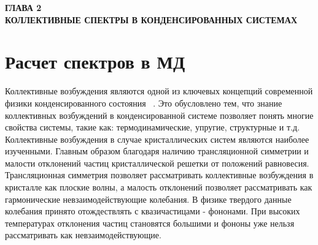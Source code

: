 
\newpage
\begin{center}
\textbf{ГЛАВА 2}\\
\textbf{КОЛЛЕКТИВНЫЕ СПЕКТРЫ В КОНДЕНСИРОВАННЫХ СИСТЕМАХ}
\end{center}


\section{Расчет спектров в МД}


Коллективные возбуждения являются одной из ключевых концепций современной
физики конденсированного состояния ~\cite{dove_1993, HansenMacDonald, landau.statphys}. Это обусловлено тем,
что знание коллективных возбуждений в конденсированной системе позволяет
понять многие свойства системы, такие как: термодинамические, упругие,
структурные и т.д. Коллективные возбуждения в случае кристаллических систем
являются наиболее изученными. Главным образом благодаря наличию
трансляционной симметрии и малости отклонений частиц кристаллической решетки
от положений равновесия. Трансляционная симметрия позволяет рассматривать
коллективные возбуждения в кристалле как плоские волны, а малость
отклонений позволяет рассматривать как гармонические невзаимодействующие
колебания. В физике твердого данные колебания принято отождествлять
с квазичастицами - фононами. При высоких температурах отклонения
частиц становятся большими и фононы уже нельзя рассматривать как невзаимодействующие.


